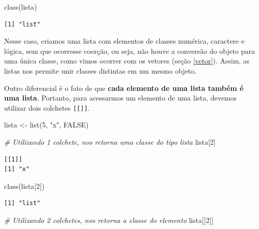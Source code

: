 \documentclass[
  brazilian,
]{book}
\newenvironment{Shaded}{\begin{snugshade}}{\end{snugshade}}
\newcommand{\CommentTok}[1]{\textcolor[rgb]{0.56,0.35,0.01}{\textit{#1}}}
\newcommand{\ConstantTok}[1]{\textcolor[rgb]{0.00,0.00,0.00}{#1}}
\newcommand{\DecValTok}[1]{\textcolor[rgb]{0.00,0.00,0.81}{#1}}
\newcommand{\FunctionTok}[1]{\textcolor[rgb]{0.00,0.00,0.00}{#1}}
\newcommand{\NormalTok}[1]{#1}
\newcommand{\OtherTok}[1]{\textcolor[rgb]{0.56,0.35,0.01}{#1}}
\newcommand{\StringTok}[1]{\textcolor[rgb]{0.31,0.60,0.02}{#1}}
\begin{document}
\begin{Shaded}
\begin{Highlighting}[]
\FunctionTok{class}\NormalTok{(lista)}
\end{Highlighting}
\end{Shaded}

\begin{verbatim}
[1] "list"
\end{verbatim}

Nesse caso, criamos uma lista com elementos de classes numérica, caractere e lógica, sem que ocorresse coerção, ou seja, não houve a conversão do objeto para uma única classe, como vimos ocorrer com os vetores (seção \ref{vetor}). Assim, as listas nos permite unir classes distintas em um mesmo objeto.

Outro diferencial é o fato de que \textbf{cada elemento de uma lista também é uma lista}. Portanto, para acessarmos um elemento de uma lista, devemos utilizar dois colchetes \texttt{{[}{[}{]}{]}}.

\begin{Shaded}
\begin{Highlighting}[]
\NormalTok{lista }\OtherTok{\textless{}{-}} \FunctionTok{list}\NormalTok{(}\DecValTok{5}\NormalTok{, }\StringTok{"x"}\NormalTok{, }\ConstantTok{FALSE}\NormalTok{)}

\CommentTok{\# Utilizando 1 colchete, nos retorna uma classe do tipo lista}
\NormalTok{lista[}\DecValTok{2}\NormalTok{]}
\end{Highlighting}
\end{Shaded}

\begin{verbatim}
[[1]]
[1] "x"
\end{verbatim}

\begin{Shaded}
\begin{Highlighting}[]
\FunctionTok{class}\NormalTok{(lista[}\DecValTok{2}\NormalTok{])}
\end{Highlighting}
\end{Shaded}

\begin{verbatim}
[1] "list"
\end{verbatim}

\begin{Shaded}
\begin{Highlighting}[]
\CommentTok{\# Utilizando 2 colchetes, nos retorna a classe do elemento}
\NormalTok{lista[[}\DecValTok{2}\NormalTok{]]}
\end{Highlighting}
\end{Shaded}
\end{document}
